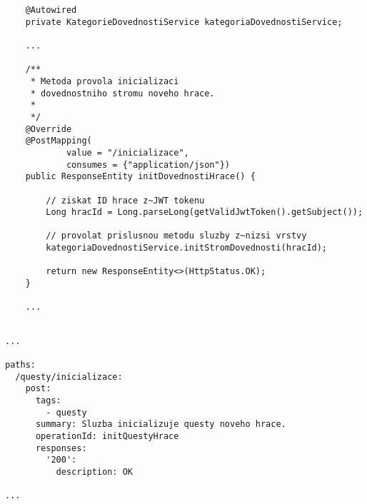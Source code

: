 \documentclass[twoside, 12pt]{article}
\begin{document}
{{\begin{lstlisting}
    @Autowired
    private KategorieDovednostiService kategoriaDovednostiService;

    ...

    /**
     * Metoda provola inicializaci
     * dovednostniho stromu noveho hrace.
     *
     */
    @Override
    @PostMapping(
            value = "/inicializace",
            consumes = {"application/json"})
    public ResponseEntity initDovednostiHrace() {

        // ziskat ID hrace z~JWT tokenu
        Long hracId = Long.parseLong(getValidJwtToken().getSubject());

        // provolat prislusnou metodu sluzby z~nizsi vrstvy
        kategoriaDovednostiService.initStromDovednosti(hracId);

        return new ResponseEntity<>(HttpStatus.OK);
    }

    ...

\end{lstlisting}

\clearpage


\vspace{10}



\vspace{10}


\vspace{10}




\begin{lstlisting}

...

paths:
  /questy/inicializace:
    post:
      tags:
        - questy
      summary: Sluzba inicializuje questy noveho hrace.
      operationId: initQuestyHrace
      responses:
        '200':
          description: OK

...

\end{lstlisting}

}}
\end{document}
